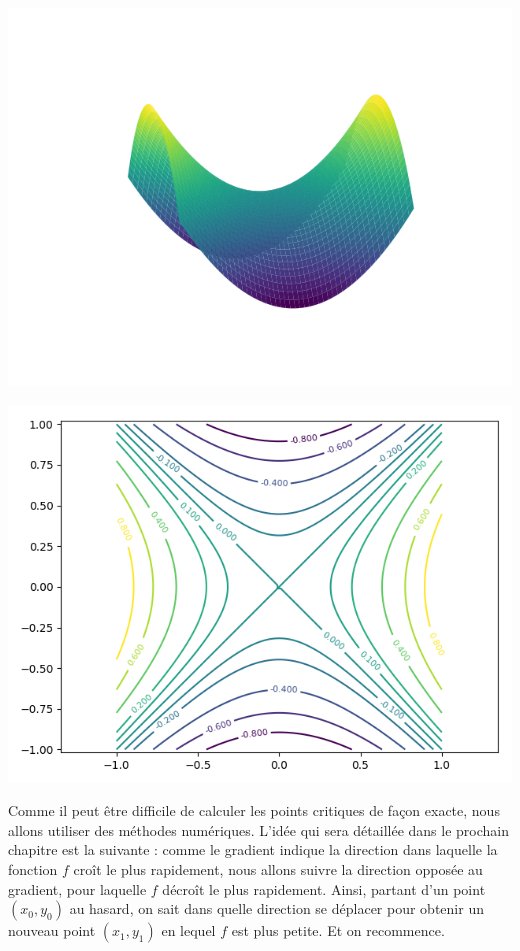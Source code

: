 \documentclass[11pt,class=report,crop=false]{standalone}
\begin{document}
\begin{exemple}
\begin{center}
\includegraphics[scale=\myscale,scale=0.5]{figures/gradient-surface-3c}
\end{center}
\begin{center}
\includegraphics[scale=\myscale,scale=0.7]{figures/gradient-surface-4}
\end{center}


\end{exemple}


Comme il peut être difficile de calculer les points critiques de façon exacte, nous allons utiliser des méthodes numériques.
L'idée qui sera détaillée dans le prochain chapitre est la suivante : comme le gradient indique la direction dans laquelle la fonction $f$ croît le plus rapidement, nous allons suivre la direction opposée au gradient, pour laquelle $f$ décroît le plus rapidement. Ainsi, partant d'un point $(x_0,y_0)$ au hasard, on sait dans quelle direction se déplacer pour obtenir un nouveau point $(x_1,y_1)$ en lequel $f$ est plus petite. Et on recommence.
\end{document}
